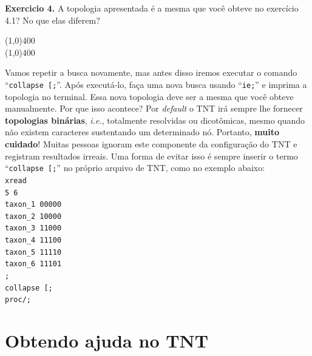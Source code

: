 \begin{refsection}
\begin{blackBlock}{\textbf{Exercicio 4.}}\label{tut4:ex:4.2}
	A topologia apresentada é a mesma que você obteve no exercício 4.1? No que elas diferem?
\vspace{90pt}
 \begin{center}
  \line(1,0){400}\\
  \line(1,0){400}\\
 \end{center}

\end{blackBlock}

Vamos repetir a busca novamente, mas antes disso iremos executar o comando ``\texttt{collapse [;}''. Após executá-lo, faça uma nova busca usando ``\texttt{ie;}'' e imprima a topologia no terminal. Essa nova topologia deve ser a mesma que você obteve manualmente. Por que isso acontece? Por \textit{default} o TNT irá sempre lhe fornecer \textbf{topologias binárias}, \textit{i.e.}, totalmente resolvidas ou dicotômicas, mesmo quando não existem caracteres sustentando um determinado nó. Portanto, \textbf{muito cuidado}! Muitas pessoas ignoram este componente da configuração do TNT e registram resultados irreais. Uma forma de evitar isso é sempre inserir o termo ``\texttt{collapse [;}'' no próprio arquivo de TNT, como no exemplo abaixo:
\\
\indent\indent\indent\texttt{xread}\\
\indent\indent\indent\texttt{5 6}\\
\indent\indent\indent\texttt{taxon\_1 00000}\\
\indent\indent\indent\texttt{taxon\_2 10000}\\
\indent\indent\indent\texttt{taxon\_3 11000}\\
\indent\indent\indent\texttt{taxon\_4 11100}\\
\indent\indent\indent\texttt{taxon\_5 11110}\\
\indent\indent\indent\texttt{taxon\_6 11101}\\
\indent\indent\indent\texttt{;}\\
\indent\indent\indent\texttt{collapse [;}\\
\indent\indent\indent\texttt{proc/;}\\

\section{Obtendo ajuda no TNT}\label{tut4:help}


\end{refsection}
